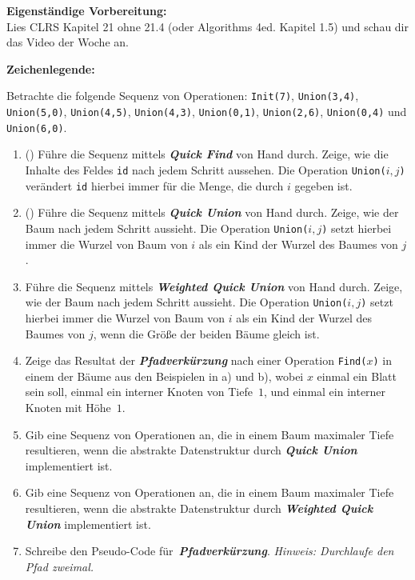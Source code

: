 \documentclass{uebung_cs}
\newcommand{\qfind}{\textit{\textbf{Quick Find}}\xspace}
\newcommand{\qunion}{\textit{\textbf{Quick Union}}\xspace}
\newcommand{\wqunion}{\textit{\textbf{Weighted Quick Union}}\xspace}
\newcommand{\pathcomp}{\textit{\textbf{Pfadverkürzung}}\xspace}
\begin{document}
\textbf{Eigenständige Vorbereitung:}\\
Lies  CLRS Kapitel 21 ohne 21.4 (oder Algorithms 4ed. Kapitel 1.5) und schau dir das  Video der Woche an.

\textbf{Zeichenlegende:}
\legende{}


\begin{aufgabe}\label{tue-first}
	Betrachte die folgende Sequenz von Operationen:
	\texttt{Init(7)}, \texttt{Union(3,4)}, \texttt{Union(5,0)}, \texttt{Union(4,5)}, \texttt{Union(4,3)}, \texttt{Union(0,1)}, \texttt{Union(2,6)}, \texttt{Union(0,4)} und \texttt{Union(6,0)}.
	\begin{enumerate}
		\item (\warmup) Führe die Sequenz mittels \qfind{} von Hand durch.
		Zeige, wie die Inhalte des Feldes \texttt{id} nach jedem Schritt aussehen.
		Die Operation \texttt{Union($i,j$)} verändert \texttt{id} hierbei immer für die Menge, die durch $i$ gegeben ist.
		\item (\warmup) Führe die Sequenz mittels \qunion{} von Hand durch.
		Zeige, wie der Baum nach jedem Schritt aussieht.
		Die Operation \texttt{Union($i,j$)} setzt hierbei immer die Wurzel von Baum von $i$ als ein Kind der Wurzel des Baumes von $j$.
		\item Führe die Sequenz mittels \wqunion{} von Hand durch.
		Zeige, wie der Baum nach jedem Schritt aussieht.
		Die Operation \texttt{Union($i,j$)} setzt hierbei immer die Wurzel von Baum von $i$ als ein Kind der Wurzel des Baumes von $j$, wenn die Größe der beiden Bäume gleich ist.
		\item Zeige das Resultat der \pathcomp{} nach einer Operation \texttt{Find($x$)} in einem der Bäume aus den Beispielen in a) und b), wobei $x$ einmal ein Blatt sein soll, einmal ein interner Knoten von Tiefe~$1$, und einmal ein interner Knoten mit Höhe~$1$.
		\item Gib eine Sequenz von Operationen an, die in einem Baum maximaler Tiefe resultieren, wenn die abstrakte Datenstruktur durch \qunion{} implementiert ist.
		\item Gib eine Sequenz von Operationen an, die in einem Baum maximaler Tiefe resultieren, wenn die abstrakte Datenstruktur durch \wqunion{} implementiert ist.
		\item Schreibe den Pseudo-Code für~\pathcomp{}. \emph{Hinweis: Durchlaufe den Pfad zweimal.}
	\end{enumerate}
\end{aufgabe}
\end{document}
